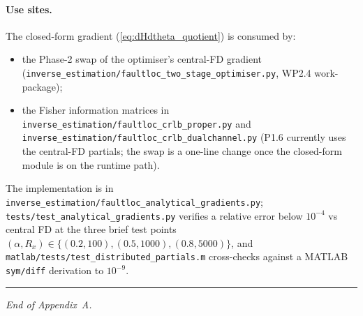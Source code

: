 \documentclass[11pt,a4paper]{article}
\begin{document}
\paragraph{Use sites.}
The closed-form gradient (\ref{eq:dHdtheta_quotient}) is consumed by:
\begin{itemize}[leftmargin=2em]
  \item the Phase-2 swap of the optimiser's central-FD gradient
        (\texttt{inverse\_estimation/faultloc\_two\_stage\_optimiser.py},
        WP2.4 work-package);
  \item the Fisher information matrices in
        \texttt{inverse\_estimation/faultloc\_crlb\_proper.py} and
        \texttt{inverse\_estimation/faultloc\_crlb\_dualchannel.py}
        (P1.6 currently uses the central-FD partials; the swap is
        a one-line change once the closed-form module is on the
        runtime path).
\end{itemize}
The implementation is in
\texttt{inverse\_estimation/faultloc\_analytical\_gradients.py};
\texttt{tests/test\_analytical\_gradients.py} verifies a relative
error below $10^{-4}$ vs central FD at the three brief test points
$(\alpha, R_x) \in \{(0.2, 100), (0.5, 1000), (0.8, 5000)\}$, and
\texttt{matlab/tests/test\_distributed\_partials.m} cross-checks
against a MATLAB \texttt{sym/diff} derivation to $10^{-9}$.

\bigskip\hrule\bigskip
\noindent\textit{End of Appendix~A.}
\end{document}
